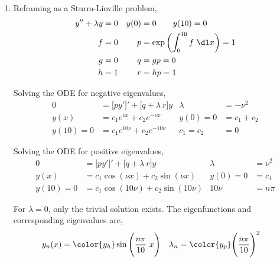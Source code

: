 \begin{enumerate}
    \item Reframing as a Sturm-Lioville problem,
          \begin{align}
              y'' + \lambda y & = 0                                             &
              y(0)            & = 0 \qquad y(10) = 0                              \\
              f               & = 0                                             &
              p               & = \exp\left( \int_{0}^{10} f\ \dl x \right) = 1   \\
              g               & = 0                                             &
              q               & = gp = 0                                          \\
              h               & = 1                                             &
              r               & = hp = 1
          \end{align}

          Solving the ODE for negative eigenvalues,
          \begin{align}
              0         & = \Big[ py' \Big]' + \Big[ q + \lambda\ r \Big] y &
              \lambda   & = -\nu^2                                            \\
              y(x)      & = c_1 e^{\nu x} + c_2 e^{-\nu x}                  &
              y(0)= 0   & = c_1 + c_2                                         \\
              y(10) = 0 & = c_1 e^{10\nu} + c_2e^{-10\nu}                   &
              c_1 = c_2 & = 0
          \end{align}

          Solving the ODE for positive eigenvalues,
          \begin{align}
              0         & = \Big[ py' \Big]' + \Big[ q + \lambda\ r \Big] y &
              \lambda   & = \nu^2                                             \\
              y(x)      & = c_1 \cos(\nu x) + c_2 \sin(\nu x)               &
              y(0)= 0   & = c_1                                               \\
              y(10) = 0 & = c_1 \cos(10\nu) + c_2 \sin(10\nu)               &
              10\nu     & = n\pi
          \end{align}

          For $ \lambda = 0 $, only the trivial solution exists. The eigenfunctions and
          corresponding eigenvalues are,
          \begin{align}
              y_n(x)    & = \color{y_h} \sin\Bigg( \frac{n\pi}{10}\ x \Bigg) &
              \lambda_n & = \color{y_p} \Bigg( \frac{n\pi}{10} \Bigg)^2
          \end{align}


\end{enumerate}

